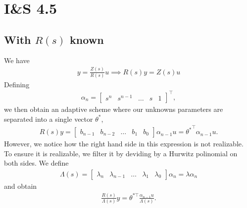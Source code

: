 \documentclass[]{article}
\title{}
\author{Sigurd Totland | MTTK}
\begin{document}
\maketitle

\section{I\&S 4.5}
\subsection{With $R(s)$ known}
We have
\begin{equation}\begin{aligned}
\label{eq:sys}
y = \frac{Z(s)}{R(s)}u \implies R(s)y = Z(s)u
\end{aligned}\end{equation}
Defining
\begin{equation}\begin{aligned}
\alpha_n = \begin{bmatrix}
s^n & s^{n-1} & \dots & s & 1
\end{bmatrix}^\top,
\end{aligned}\end{equation}
we then obtain an adaptive scheme where our unknowns parameters are separated into a single vector $\theta^*$,
\begin{equation}\begin{aligned}
R(s)y =
\begin{bmatrix}
b_{n-1} & b_{n-2} & \dots & b_1 & b_0
\end{bmatrix}
\alpha_{n-1} u
= {\theta^*}^\top \alpha_{n-1} u.
\end{aligned}\end{equation}
However, we notice how the right hand side in this expression is not realizable. To ensure it is realizable, we filter it by deviding by a Hurwitz polinomial on both sides. We define
\begin{equation}\begin{aligned}
\Lambda(s) =
\begin{bmatrix}
\lambda_n & \lambda_{n-1} & \dots & \lambda_1 & \lambda_0
\end{bmatrix}
\alpha_n
= \lambda \alpha_n
\end{aligned}\end{equation}
and obtain
\begin{equation}\begin{aligned}
\frac{R(s)}{\Lambda(s)}y = \theta^{*\top} \frac{\alpha_{n-1}u}{\Lambda(s)}.
\end{aligned}\end{equation}
\end{document}

